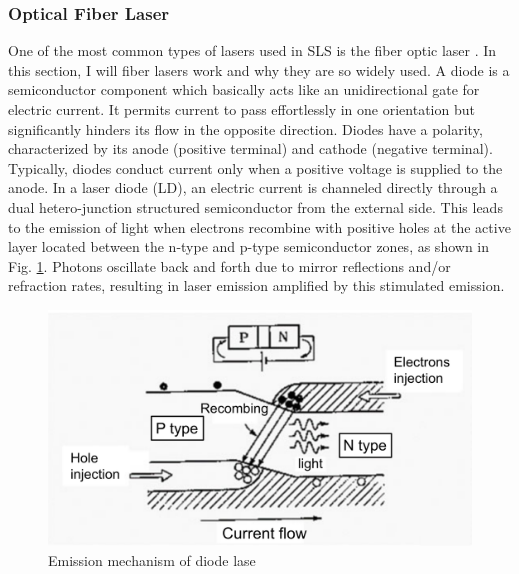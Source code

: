 \subsubsection{Optical Fiber Laser}
\label{sssec:fiberlaser}
One of the most common types of lasers used in SLS is the fiber optic laser \cite{milewski_additive_2017}. In this section, I will fiber lasers work and why they are so widely used. A diode is a semiconductor component which basically acts like an unidirectional gate for electric current. It permits current to pass effortlessly in one orientation but significantly hinders its flow in the opposite direction. Diodes have a polarity, characterized by its anode (positive terminal) and cathode (negative terminal). Typically, diodes conduct current only when a positive voltage is supplied to the anode. In a laser diode (LD), an electric current is channeled directly through a dual hetero-junction structured semiconductor from the external side. This leads to the emission of light when electrons recombine with positive holes at the active layer located between the n-type and p-type semiconductor zones, as shown in Fig. \ref{fig:np}. Photons oscillate back and forth due to mirror reflections and/or refraction rates, resulting in laser emission amplified by this stimulated emission.
\begin{figure}
    \centering
    \includegraphics[scale=0.4]{Images/np.png}
    \caption[Emission mechanism of diode lase.]{Emission mechanism of diode lase \cite{katayama_fundamentals_2020}}
    \label{fig:np}
\end{figure}
